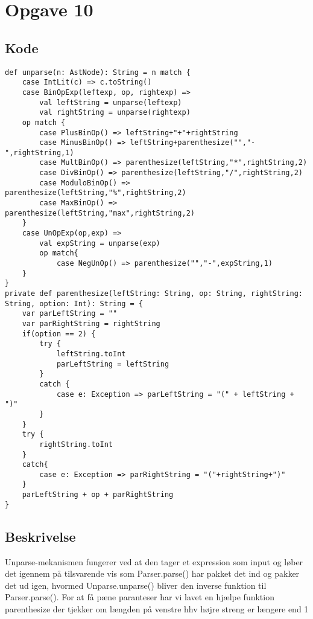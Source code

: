 \documentclass[a4paper, 10pt]{article}
\begin{document}
\section*{Opgave 10}
\subsection*{Kode}
\begin{lstlisting}
def unparse(n: AstNode): String = n match {
	case IntLit(c) => c.toString()
	case BinOpExp(leftexp, op, rightexp) =>
		val leftString = unparse(leftexp)
		val rightString = unparse(rightexp)
	op match {
		case PlusBinOp() => leftString+"+"+rightString
		case MinusBinOp() => leftString+parenthesize("","-",rightString,1)
		case MultBinOp() => parenthesize(leftString,"*",rightString,2)
		case DivBinOp() => parenthesize(leftString,"/",rightString,2)
		case ModuloBinOp() => parenthesize(leftString,"%",rightString,2)
		case MaxBinOp() => parenthesize(leftString,"max",rightString,2)
	}
	case UnOpExp(op,exp) =>
		val expString = unparse(exp)
		op match{
			case NegUnOp() => parenthesize("","-",expString,1)
	}
}
private def parenthesize(leftString: String, op: String, rightString: String, option: Int): String = {
	var parLeftString = ""
	var parRightString = rightString
	if(option == 2) {
		try {
			leftString.toInt
			parLeftString = leftString
		}
		catch {
			case e: Exception => parLeftString = "(" + leftString + ")"
		}
	}
	try {
		rightString.toInt
	}
	catch{
		case e: Exception => parRightString = "("+rightString+")"
	}
	parLeftString + op + parRightString
}
\end{lstlisting}
\subsection*{Beskrivelse}
Unparse-mekanismen fungerer ved at den tager et expression som input og løber det igennem på tilsvarende vis som Parser.parse() har pakket det ind og pakker det ud igen, hvormed Unparse.unparse() bliver den inverse funktion til Parser.parse(). For at få pæne paranteser har vi lavet en hjælpe funktion parenthesize der tjekker om længden på venstre hhv højre streng er længere end 1
\end{document}
